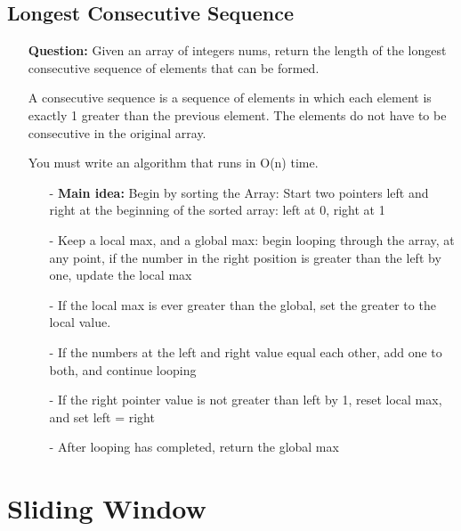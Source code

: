 \documentclass[12pt]{article}
\begin{document}
\subsection{Longest Consecutive Sequence}
\begin{enumerate}
  \item[] \textbf{Question:} Given an array of integers nums, return the length of the longest consecutive sequence of elements that can be formed.

A consecutive sequence is a sequence of elements in which each element is exactly 1 greater than the previous element. The elements do not have to be consecutive in the original array.

You must write an algorithm that runs in O(n) time.


    \begin{enumerate}
      \item[-] \textbf{Main idea: } Begin by sorting the Array: Start two pointers left and right at the beginning of the sorted array: left at 0, right at 1
      \item[-] Keep a local max, and a global max: begin looping through the array, at any point, if the number in the right position is greater than the left by one, update the local max
      \item[-] If the local max is ever greater than the global, set the greater to the local value.
      \item[-] If the numbers at the left and right value equal each other, add one to both, and continue looping

      \item[-] If the right pointer value is not greater than left by 1, reset local max, and set left = right
      \item[-] After looping has completed, return the global max

    \end{enumerate}
\end{enumerate}




\section{Sliding Window}
\end{document}
